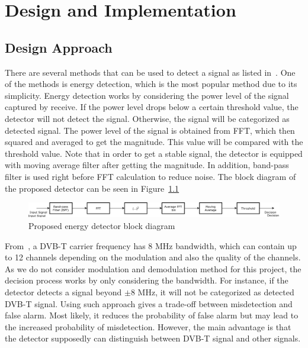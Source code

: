 \chapter{Design and Implementation}

\section{Design Approach}

There are several methods that can be used to detect a signal as listed in~\cite{riviello2013sensing}. One of the methods is energy detection, which is the most popular method due to its simplicity. Energy detection works by considering the power level of the signal captured by receive. If the power level drops below a certain threshold value, the detector will not detect the signal. Otherwise, the signal will be categorized as detected signal. The power level of the signal is obtained from FFT, which then squared and averaged to get the magnitude. This value will be compared with the threshold value. Note that in order to get a stable signal, the detector is equipped with moving average filter after getting the magnitude. In addition, band-pass filter is used right before FFT calculation to reduce noise. The block diagram of the proposed detector can be seen in Figure~\ref{fig:block-diagram}

\begin{figure}[h]
	\centering
    \includegraphics[width=\textwidth]{figures/block-diagram}
    \caption{Proposed energy detector block diagram}
    \label{fig:block-diagram}
\end{figure}

From~\cite{radiotvnederland}, a DVB-T carrier frequency has 8 MHz bandwidth, which can contain up to 12 channels depending on the modulation and also the quality of the channels. As we do not consider modulation and demodulation method for this project, the decision process works by only considering the bandwidth. For instance, if the detector detects a signal beyond $\pm$8 MHz, it will not be categorized as detected DVB-T signal. Using such approach gives a trade-off between misdetection and false alarm. Most likely, it reduces the probability of false alarm but may lead to the increased probability of misdetection.  However, the main advantage is that the detector supposedly can distinguish between DVB-T signal and other signals.


